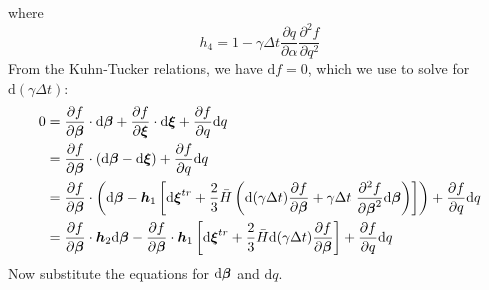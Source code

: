\documentclass[10pt]{article}
\begin{document}
where
\begin{equation}
h_4 = {1 - \gamma\Delta t \frac{\partial q}{\partial \alpha}\frac{\partial^2 f}{\partial q^2}}
\end{equation}
From the Kuhn-Tucker relations, we have $\mathrm{d}f = 0$, which we use to solve for $\mathrm{d}(\gamma \Delta t)$:
\begin{equation}
\begin{aligned}
0 &=
\frac{\partial f}{\partial \mbox{\boldmath$\beta$}}\cdot\mathrm{d}\mbox{\boldmath$\beta$}
+ \frac{\partial f}{\partial \mbox{\boldmath$\xi$}}\cdot\mathrm{d}\mbox{\boldmath$\xi$}
+ \frac{\partial f}{\partial q}\mathrm{d}q\\
&=
\frac{\partial f}{\partial \mbox{\boldmath$\beta$}}\cdot
\left(\mathrm{d}\mbox{\boldmath$\beta$}
- \mathrm{d}\mbox{\boldmath$\xi$}\right)
+ \frac{\partial f}{\partial q}\mathrm{d}q\\
&=
\frac{\partial f}{\partial \mbox{\boldmath$\beta$}}\cdot
\left(\mathrm{d}\mbox{\boldmath$\beta$}
- \mbox{\boldmath$ h$}_1
\left[
\mathrm{d}\mbox{\boldmath$\xi$}^{tr} +
\frac{2}{3}\bar{H}\left(
\mathrm{d}(\gamma\Delta t)\frac{\partial f}{\partial\mbox{\boldmath$\beta$}}
+
\gamma\Delta t\
\frac{\partial^2 f}{\partial\mbox{\boldmath$\beta$}^2}
\mathrm{d}\mbox{\boldmath$\beta$}
\right)
\right] \right)
+ \frac{\partial f}{\partial q}\mathrm{d}q\\
&=
\frac{\partial f}{\partial \mbox{\boldmath$\beta$}}\cdot
\mbox{\boldmath$ h$}_2\mathrm{d}\mbox{\boldmath$\beta$}
- \frac{\partial f}{\partial \mbox{\boldmath$\beta$}}\cdot\mbox{\boldmath$ h$}_1
\left[
\mathrm{d}\mbox{\boldmath$\xi$}^{tr} +
\frac{2}{3}\bar{H}
\mathrm{d}(\gamma\Delta t)\frac{\partial f}{\partial\mbox{\boldmath$\beta$}}
\right]
+ \frac{\partial f}{\partial q}\mathrm{d}q\\
\end{aligned}
\end{equation}
Now substitute the equations for $\mathrm{d}\mbox{\boldmath$\beta$}$ and $\mathrm{d}q$.
\end{document}
